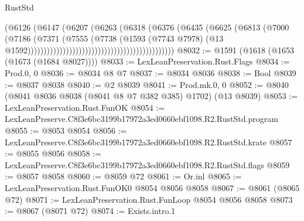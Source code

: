 \begin{lexlean}{RustStd}
\begin{coremodule}
                                                                (@6126
                                                                  (@6147
                                                                    (@6207
                                                                      (@6263
                                                                        (@6318
                                                                          (@6376
                                                                            (@6435
                                                                              (@6625
                                                                                (@6813
                                                                                  (@7000
                                                                                    (@7186
                                                                                      (@7371
                                                                                        (@7555
                                                                                          (@7738
                                                                                            (@1593
                                                                                              (@7743
                                                                                                @7978)
                                                                                              (@13
                                                                                                @1592))))))))))))))))))))))))))))))))))))))))))))))
@8032 := @1591 (@1618 (@1653 (@1673 (@1684 @8027))))
@8033 := LexLeanPreservation.Rust.Flags
@8034 := Prod.{0, 0}
@8036 := @8034 @8 @7
@8037 := @8034 @8036
@8038 := Bool
@8039 := @8037 @8038
@8040 := @2 @8039
@8041 := Prod.mk.{0, 0}
@8052 := @8040 (@8041 @8036 @8038 (@8041 @8 @7 @382 @385) @1702) (@13 @8039)
@8053 := LexLeanPreservation.Rust.FunOK
@8054 := LexLeanPreserve.C8f3e6bc3199b17972a3ed0660ebf1098.R2.RustStd.program
@8055 := @8053 @8054
@8056 := LexLeanPreserve.C8f3e6bc3199b17972a3ed0660ebf1098.R2.RustStd.krate
@8057 := @8055 @8056
@8058 := LexLeanPreserve.C8f3e6bc3199b17972a3ed0660ebf1098.R2.RustStd.flags
@8059 := @8057 @8058
@8060 := @8059 @72
@8061 := Or.inl
@8065 := LexLeanPreservation.Rust.FunOK0 @8054 @8056 @8058
@8067 := @8061 (@8065 @72)
@8071 := LexLeanPreservation.Rust.FunLoop @8054 @8056 @8058
@8073 := @8067 (@8071 @72)
@8074 := Exists.intro.{1}

\end{coremodule}
\end{lexlean}

